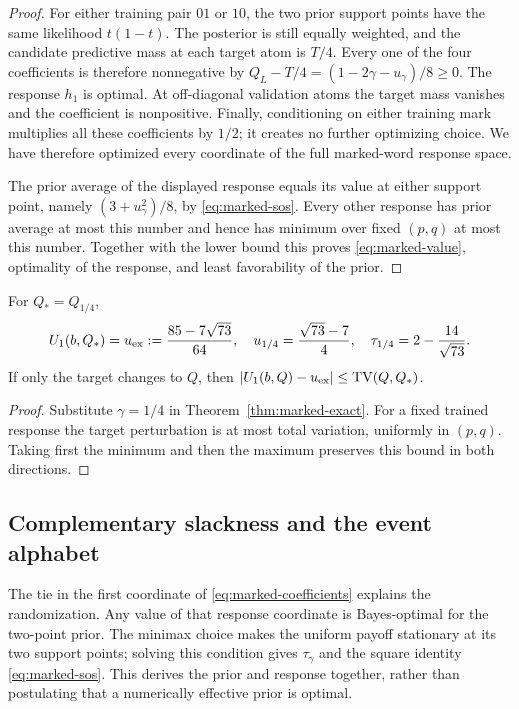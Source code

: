 \begin{proof}
For either training pair $01$ or $10$, the two prior support points have
the same likelihood $t(1-t)$. The posterior is still equally weighted,
and the candidate predictive mass at each target atom is $T/4$.
Every one of the four coefficients is therefore nonnegative by
$Q_L-T/4=(1-2\gamma-u_\gamma)/8\ge0$.
The response $h_1$ is optimal. At off-diagonal validation atoms the target
mass vanishes and the coefficient is nonpositive. Finally, conditioning
on either training mark multiplies all these coefficients by $1/2$;
it creates no further optimizing choice. We have therefore optimized
every coordinate of the full marked-word response space.

The prior average of the displayed response equals its value at either
support point, namely $(3+u_\gamma^2)/8$, by \eqref{eq:marked-sos}.
Every other response has prior average at most this number and hence
has minimum over fixed $(p,q)$ at most this number. Together with the
lower bound this proves \eqref{eq:marked-value}, optimality of the
response, and least favorability of the prior.
\end{proof}

\begin{corollary}
\label{cor:exact-one}
For $Q_*=Q_{1/4}$,
\begin{equation}\label{eq:exact-one}
 U_1(b,Q_*)=u_{\rm ex}:=\frac{85-7\sqrt{73}}{64},\quad
 u_{1/4}=\frac{\sqrt{73}-7}{4},\quad
 \tau_{1/4}=2-\frac{14}{\sqrt{73}}.
\end{equation}
If only the target changes to $Q$, then
$|U_1(b,Q)-u_{\rm ex}|\le\operatorname{TV}(Q,Q_*)$.
\end{corollary}
\begin{proof}
Substitute $\gamma=1/4$ in Theorem~\ref{thm:marked-exact}.
For a fixed trained response the target perturbation is at most total
variation, uniformly in $(p,q)$. Taking first the minimum and then the
maximum preserves this bound in both directions.
\end{proof}

\subsection{Complementary slackness and the event alphabet}
The tie in the first coordinate of \eqref{eq:marked-coefficients}
explains the randomization. Any value of that response coordinate is
Bayes-optimal for the two-point prior. The minimax choice makes the
uniform payoff stationary at its two support points; solving this
condition gives $\tau_\gamma$ and the square identity
\eqref{eq:marked-sos}. This derives the prior and response together,
rather than postulating that a numerically effective prior is optimal.

